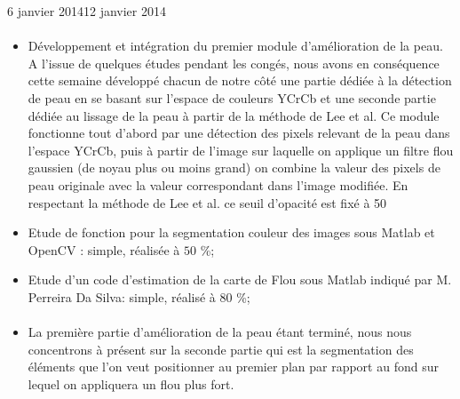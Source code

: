 \documentclass[11pt, french]{report-rd-info}
\begin{document}
\begin{fichesuivi}{6 janvier 2014}{12 janvier 2014}
\paragraph{}
	\begin{travaileffectue}
		\begin{itemize}
			\item Développement et intégration du premier module d’amélioration de la peau. A l’issue de quelques études pendant les congés, nous avons en conséquence cette semaine développé chacun de notre côté une partie dédiée à la détection de peau en se basant sur l’espace de couleurs YCrCb et une seconde partie dédiée au lissage de la peau à partir de la méthode de Lee et al. Ce module fonctionne tout d’abord par une détection des pixels relevant de la peau dans l’espace YCrCb, puis à partir de l’image sur laquelle on applique un filtre flou gaussien (de noyau plus ou moins grand) on combine la valeur des pixels de peau originale avec la valeur correspondant dans l’image modifiée. En respectant la méthode de Lee et al. ce seuil d’opacité est fixé à 50%
			\item Etude de fonction pour la segmentation couleur des images sous Matlab et OpenCV : simple, réalisée à $50$ \%;
			\item Etude d’un code d’estimation de la carte de Flou sous Matlab indiqué par M. Perreira Da Silva: simple, réalisé à $80$ \%;
		\end{itemize}
	\end{travaileffectue}

\paragraph*{}
	\begin{planification}
		\begin{itemize}
			\item La première partie d’amélioration de la peau étant terminé, nous nous concentrons à présent sur la seconde partie qui est la segmentation des éléments que l’on veut positionner au premier plan par rapport au fond sur lequel on appliquera un flou plus fort.		
\end{itemize}
	\end{planification}
\end{fichesuivi}
\end{document}
